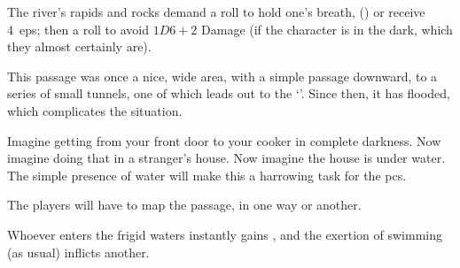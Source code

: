 \begin{multicols}{2}
The river's rapids and rocks demand a  roll to hold one's breath, (\tn[10]) or receive 4~\glspl{ep}; then a  roll to avoid $1D6+2$ Damage (\tn[16] if the character is in the dark, which they almost certainly are).


\begin{exampletext}
  This passage was once a nice, wide area, with a simple passage downward, to a series of small tunnels, one of which leads out to the `'.
  Since then, it has flooded, which complicates the situation.
\end{exampletext}

Imagine getting from your front door to your cooker in complete darkness.
Now imagine doing that in a stranger's house.
Now imagine the house is under water.
The simple presence of water will make this a harrowing task for the \glspl{pc}.

The players will have to map the passage, in one way or another.

Whoever enters the frigid waters instantly gains , and the exertion of swimming (as usual) inflicts another.


\end{multicols}
